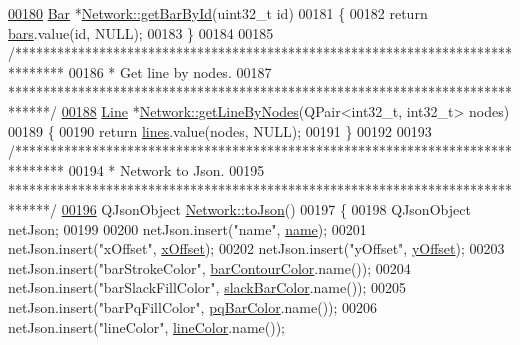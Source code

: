 \begin{DoxyCode}
\hypertarget{network_8cpp_source_l00180}{}\hyperlink{group___models_ga04d524ce0fa0dd0d06deda92b1597af0}{00180} \hyperlink{class_bar}{Bar} *\hyperlink{group___models_ga04d524ce0fa0dd0d06deda92b1597af0}{Network::getBarById}(uint32\_t \textcolor{keywordtype}{id})
00181 \{
00182   \textcolor{keywordflow}{return} \hyperlink{class_network_ae37a8418e42adf765b143cdc9d992b6c}{bars}.value(\textcolor{keywordtype}{id}, NULL);
00183 \}
00184 
00185 \textcolor{comment}{/*******************************************************************************}
00186 \textcolor{comment}{ * Get line by nodes.}
00187 \textcolor{comment}{ ******************************************************************************/}
\hypertarget{network_8cpp_source_l00188}{}\hyperlink{group___models_ga8f090b85a7779695cb9f05b6395b3044}{00188} \hyperlink{class_line}{Line} *\hyperlink{group___models_ga8f090b85a7779695cb9f05b6395b3044}{Network::getLineByNodes}(QPair<int32\_t, int32\_t> nodes)
00189 \{
00190   \textcolor{keywordflow}{return} \hyperlink{class_network_a49659f95d02baf087707c5a94fa23d90}{lines}.value(nodes, NULL);
00191 \}
00192 
00193 \textcolor{comment}{/*******************************************************************************}
00194 \textcolor{comment}{ * Network to Json.}
00195 \textcolor{comment}{ ******************************************************************************/}
\hypertarget{network_8cpp_source_l00196}{}\hyperlink{group___models_ga1bb9773d3935eefef84136d388786494}{00196} QJsonObject \hyperlink{group___models_ga1bb9773d3935eefef84136d388786494}{Network::toJson}()
00197 \{
00198   QJsonObject netJson;
00199 
00200   netJson.insert(\textcolor{stringliteral}{"name"}, \hyperlink{class_network_ab6643733a517f930c60b06f5ffd78186}{name});
00201   netJson.insert(\textcolor{stringliteral}{"xOffset"}, \hyperlink{class_network_a9f5c70be28a45320802bd0ac3947d114}{xOffset});
00202   netJson.insert(\textcolor{stringliteral}{"yOffset"}, \hyperlink{class_network_a771b16f7eb4459d0ca7141c048b1ab59}{yOffset});
00203   netJson.insert(\textcolor{stringliteral}{"barStrokeColor"}, \hyperlink{class_network_a20c58a0630bdbbade527d55ba48d924c}{barContourColor}.name());
00204   netJson.insert(\textcolor{stringliteral}{"barSlackFillColor"}, \hyperlink{class_network_ac6c44cb1f88cd67a4fab7eff948e2d1d}{slackBarColor}.name());
00205   netJson.insert(\textcolor{stringliteral}{"barPqFillColor"}, \hyperlink{class_network_a610c48c9e2dd9555f9b354ab72fb96cc}{pqBarColor}.name());
00206   netJson.insert(\textcolor{stringliteral}{"lineColor"}, \hyperlink{class_network_a453db7f1a994603fe4d38ac5899eb09c}{lineColor}.name());

\end{DoxyCode}
